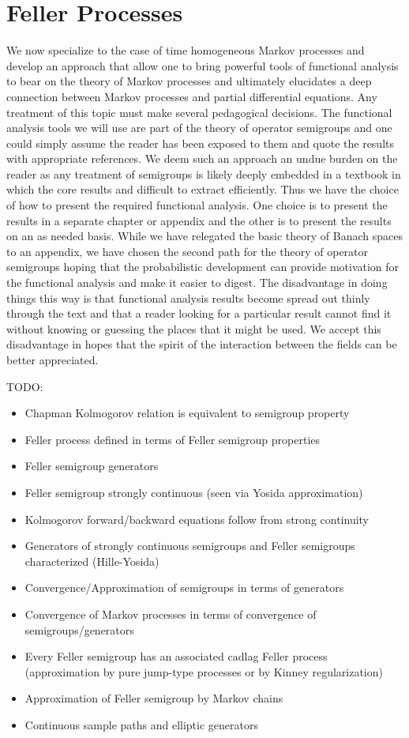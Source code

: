 \chapter{Feller Processes}

We now specialize to the case of time homogeneous Markov processes and
develop an approach that allow one to bring powerful tools of
functional analysis to bear on the theory of Markov processes and
ultimately elucidates a deep connection between Markov processes and
partial differential equations.  Any treatment of this topic must make several pedagogical
decisions.  The functional analysis tools we will use are part of the theory of operator
semigroups and one could simply assume the reader has been exposed to them and quote the
results with appropriate references.  We deem such an approach an undue burden on the reader
as any treatment of semigroups is likely deeply embedded in a textbook in which the core results
and difficult to extract efficiently.  Thus we have the choice of how to present the required functional
analysis.  One choice is to present the results in a separate chapter or appendix and the other is to 
present the results on an as needed basis.  While we have relegated the basic theory of Banach spaces to
an appendix, we have chosen the second path for the theory of operator semigroups hoping that the 
probabilistic development can provide motivation for the functional analysis and make it
easier to digest.  The disadvantage in doing things this way is that functional analysis results become spread
out thinly through the text and that a reader looking for a particular result cannot find it without knowing or guessing
the places that it might be used.  We accept this disadvantage in hopes that the spirit of the interaction between
the fields can be better appreciated.

TODO:
\begin{itemize}
\item Chapman Kolmogorov relation is equivalent to semigroup property
\item Feller process defined in terms of Feller semigroup properties
\item Feller semigroup generators
\item Feller semigroup strongly continuous (seen via Yosida approximation)
\item Kolmogorov forward/backward equations follow from strong continuity
\item Generators of strongly continuous semigroups and Feller semigroups characterized (Hille-Yosida)
\item Convergence/Approximation of semigroups in terms of generators
\item Convergence of Markov processes in terms of convergence of semigroups/generators
\item Every Feller semigroup has an associated cadlag Feller process (approximation by pure jump-type processes or by Kinney regularization)
\item Approximation of Feller semigroup by Markov chains
\item Continuous sample paths and elliptic generators
\end{itemize}

